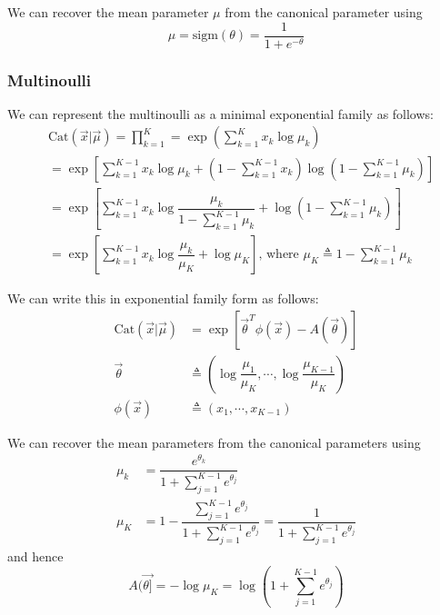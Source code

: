 \begin{refsection}
We can recover the mean parameter $\mu$ from the canonical parameter using
\begin{equation}
\mu=\mathrm{sigm}(\theta)=\dfrac{1}{1+e^{-\theta}}
\end{equation}


\subsubsection{Multinoulli}
We can represent the multinoulli as a minimal exponential family as follows:
\begin{equation*}\begin{split}
& \mathrm{Cat}(\vec{x}|\vec{\mu}) = \prod\limits_{k=1}^K = \exp\left(\sum\limits_{k=1}^K x_k\log\mu_k\right) \\
& = \exp\left[\sum\limits_{k=1}^{K-1} x_k\log\mu_k+  (1-\sum\limits_{k=1}^{K-1} x_k)\log(1-\sum\limits_{k=1}^{K-1} \mu_k)\right] \\
& = \exp\left[\sum\limits_{k=1}^{K-1} x_k\log\dfrac{\mu_k}{1-\sum_{k=1}^{K-1} \mu_k} + \log(1-\sum\limits_{k=1}^{K-1} \mu_k) \right] \\
& = \exp\left[\sum\limits_{k=1}^{K-1} x_k\log\dfrac{\mu_k}{\mu_K}+\log\mu_K\right] \text{, where } \mu_K \triangleq 1-\sum\limits_{k=1}^{K-1} \mu_k
\end{split}\end{equation*}

We can write this in exponential family form as follows:
\begin{align}
\mathrm{Cat}(\vec{x}|\vec{\mu}) & = \exp[\vec{\theta}^T\phi(\vec{x})-A(\vec{\theta})] \\
\vec{\theta} & \triangleq (\log\dfrac{\mu_1}{\mu_K},\cdots,\log\dfrac{\mu_{K-1}}{\mu_K}) \\
\phi(\vec{x}) & \triangleq (x_1,\cdots,x_{K-1})
\end{align}

We can recover the mean parameters from the canonical parameters using
\begin{align}
\mu_k & = \dfrac{e^{\theta_k}}{1+\sum_{j=1}^{K-1} e^{\theta_j}} \\
\mu_K & = 1- \dfrac{\sum_{j=1}^{K-1} e^{\theta_j}}{1+\sum_{j=1}^{K-1} e^{\theta_j}}=\dfrac{1}{1+\sum_{j=1}^{K-1} e^{\theta_j}}
\end{align}
and hence
\begin{equation}
A(\vec{\theta]} = -\log\mu_K=\log(1+\sum\limits_{j=1}^{K-1} e^{\theta_j})
\end{equation}



\end{refsection}

